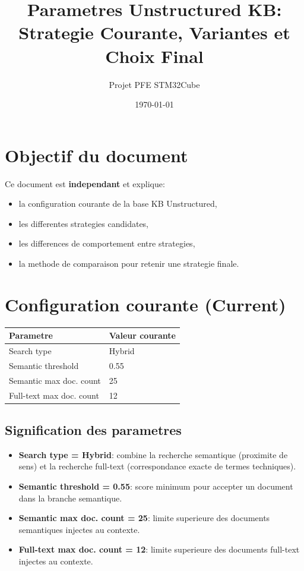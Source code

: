 \documentclass[11pt,a4paper]{article}
\title{Parametres Unstructured KB: Strategie Courante, Variantes et Choix Final}
\author{Projet PFE STM32Cube}
\date{\today}
\begin{document}
\maketitle

\section{Objectif du document}

Ce document est \textbf{independant} et explique:
\begin{itemize}
  \item la configuration courante de la base KB Unstructured,
  \item les differentes strategies candidates,
  \item les differences de comportement entre strategies,
  \item la methode de comparaison pour retenir une strategie finale.
\end{itemize}

\section{Configuration courante (Current)}

\begin{longtable}{p{5cm}p{9cm}}
\toprule
\textbf{Parametre} & \textbf{Valeur courante} \\
\midrule
Search type & Hybrid \\
Semantic threshold & 0.55 \\
Semantic max doc. count & 25 \\
Full-text max doc. count & 12 \\
\bottomrule
\end{longtable}

\subsection{Signification des parametres}

\begin{itemize}
  \item \textbf{Search type = Hybrid}: combine la recherche semantique (proximite de sens) et la recherche full-text (correspondance exacte de termes techniques).
  \item \textbf{Semantic threshold = 0.55}: score minimum pour accepter un document dans la branche semantique.
  \item \textbf{Semantic max doc. count = 25}: limite superieure des documents semantiques injectes au contexte.
  \item \textbf{Full-text max doc. count = 12}: limite superieure des documents full-text injectes au contexte.
\end{itemize}
\end{document}
